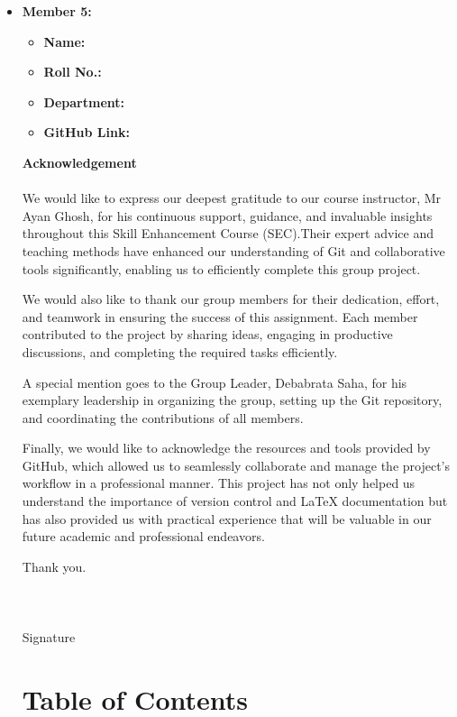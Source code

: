 \documentclass[a4paper,15pt]{article}
\begin{document}
\begin{itemize}[leftmargin=1.5cm]
    \item \textbf{Member 5:} 
    \begin{itemize}[leftmargin=1.5cm]
        \item \textbf{Name: } 
        \item \textbf{Roll No.: } 
        \item \textbf{Department: } 
        \item \textbf{GitHub Link:} \url{}
\end{itemize}

\vspace{1cm}
\newpage
\textbf{Acknowledgement}\\ \\

We would like to express our deepest gratitude to our course instructor, Mr Ayan Ghosh, for his continuous support, guidance, and invaluable insights throughout this Skill Enhancement Course (SEC).Their expert advice and teaching methods have enhanced our understanding of Git and collaborative tools significantly, enabling us to efficiently complete this group project.

We would also like to thank our group members for their dedication, effort, and teamwork in ensuring the success of this assignment. Each member contributed to the project by sharing ideas, engaging in productive discussions, and completing the required tasks efficiently.

A special mention goes to the Group Leader, Debabrata Saha, for his exemplary leadership in organizing the group, setting up the Git repository, and coordinating the contributions of all members.

Finally, we would like to acknowledge the resources and tools provided by GitHub, which allowed us to seamlessly collaborate and manage the project's workflow in a professional manner. 
This project has not only helped us understand the importance of version control and LaTeX documentation but has also provided us with practical experience that will be valuable in our future academic and professional endeavors.

Thank you.\\ \\ \\ \\
Signature

\newpage

\section*{Table of Contents}
\tableofcontents


\end{itemize}
\end{document}
